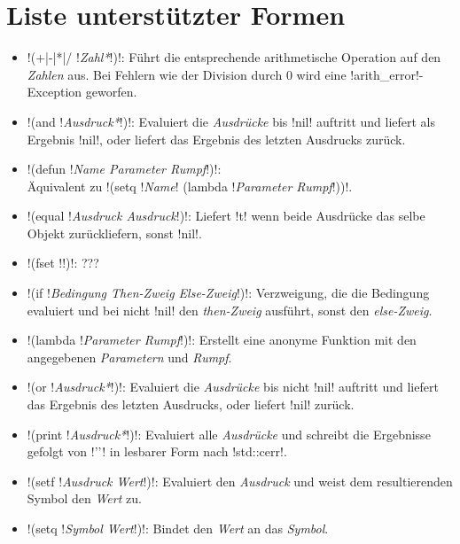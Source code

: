 \section{Liste unterstützter Formen}
\begin{itemize}
\item !(+|-|*|/ !\emph{Zahl*}!)!: Führt die entsprechende arithmetische Operation auf den \emph{Zahlen} aus. Bei Fehlern wie der Division durch $0$ wird eine !arith_error!-Exception geworfen.
\item !(and !\emph{Ausdruck*}!)!:  Evaluiert die \emph{Ausdrücke} bis !nil! auftritt und liefert als Ergebnis !nil!, oder liefert das Ergebnis des letzten Ausdrucks zurück.
\item !(defun !\emph{Name Parameter Rumpf}!)!: \\ Äquivalent zu !(setq !\emph{Name}! (lambda !\emph{Parameter Rumpf}!))!.
\item !(equal !\emph{Ausdruck Ausdruck}!)!: Liefert !t! wenn beide Ausdrücke das selbe Objekt zurückliefern, sonst !nil!.
\item !(fset !!)!: ???
\item !(if !\emph{Bedingung Then-Zweig Else-Zweig}!)!: Verzweigung, die die Bedingung evaluiert und bei nicht !nil! den \emph{then-Zweig} ausführt, sonst den \emph{else-Zweig}.
\item !(lambda !\emph{Parameter Rumpf}!)!: Erstellt eine anonyme Funktion mit den angegebenen \emph{Parametern} und \emph{Rumpf}.
\item !(or !\emph{Ausdruck*}!)!: Evaluiert die \emph{Ausdrücke} bis nicht !nil! auftritt und liefert das Ergebnis des letzten Ausdrucks, oder liefert !nil! zurück.
\item !(print !\emph{Ausdruck*}!)!: Evaluiert alle \emph{Ausdrücke} und schreibt die Ergebnisse gefolgt von !'\n'! in lesbarer Form nach !std::cerr!.
\item !(setf !\emph{Ausdruck Wert}!)!: Evaluiert den \emph{Ausdruck} und weist dem resultierenden Symbol den \emph{Wert} zu.
\item !(setq !\emph{Symbol Wert}!)!: Bindet den \emph{Wert} an das \emph{Symbol}.
\end{itemize}
